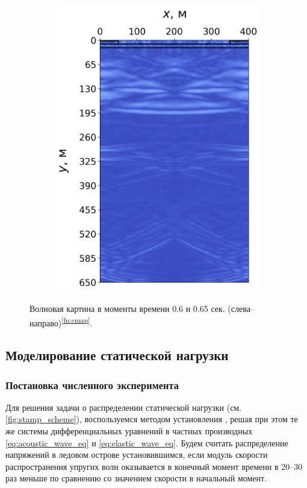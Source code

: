 \begin{figure}[H]
\begin{subfigure}{0.49\textwidth}
        \includegraphics[width=\textwidth]{images/gas_field/013000.png}
    \end{subfigure}
    \caption{Волновая картина в моменты времени 0.6 и 0.65 сек. (слева--направо)\textsuperscript{\ref{fn:cmap}}.}
    \label{fig:wave_image_3}
\end{figure}

\subsection{Моделирование статической нагрузки}
\label{sec:building}
\subsubsection{Постановка численного эксперимента}

Для решения задачи о распределении статической нагрузки (см. \autoref{fig:stamp_scheme}), воспользуемся методом установления \cite{fedorenko_relaxation}, решая при этом те же системы дифференциальных уравнений в частных производных \eqref{eq:acoustic_wave_eq} и \eqref{eq:elastic_wave_eq}. Будем считать распределение напряжений в ледовом острове установившимся, если модуль скорости распространения упругих волн оказывается в конечный момент времени в 20--30 раз меньше по сравнению со значением скорости в начальный момент.

